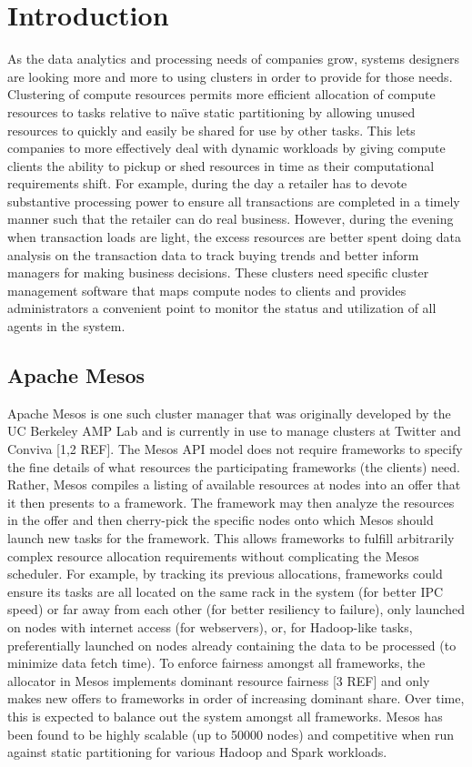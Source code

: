 \section{Introduction}
\label{sec:intro}

As the data analytics and processing needs of companies grow, systems designers are looking more and more to using clusters in order to provide for those needs. Clustering of compute resources permits more efficient allocation of compute resources to tasks relative to na\"{\i}ve static partitioning by allowing unused resources to quickly and easily be shared for use by other tasks. This lets companies to more effectively deal with dynamic workloads by giving compute clients the ability to pickup or shed resources in time as their computational requirements shift. For example, during the day a retailer has to devote substantive processing power to ensure all transactions are completed in a timely manner such that the retailer can do real business. However, during the evening when transaction loads are light, the excess resources are better spent doing data analysis on the transaction data to track buying trends and better inform managers for making business decisions. These clusters need specific cluster management software that maps compute nodes to clients and provides administrators a convenient point to monitor the status and utilization of all agents in the system.

\subsection{Apache Mesos}
Apache Mesos is one such cluster manager that was originally developed by the UC Berkeley AMP Lab and is currently in use to manage clusters at Twitter and Conviva [1,2 REF]. The Mesos API model does not require frameworks to specify the fine details of what resources the participating frameworks (the clients) need. Rather, Mesos compiles a listing of available resources at nodes into an offer that it then presents to a framework. The framework may then analyze the resources in the offer and then cherry-pick the specific nodes onto which Mesos should launch new tasks for the framework. This allows frameworks to fulfill arbitrarily complex resource allocation requirements without complicating the Mesos scheduler. For example, by tracking its previous allocations, frameworks could ensure its tasks are all located on the same rack in the system (for better IPC speed) or far away from each other (for better resiliency to failure), only launched on nodes with internet access (for webservers), or, for Hadoop-like tasks, preferentially launched on nodes already containing the data to be processed (to minimize data fetch time). To enforce fairness amongst all frameworks, the allocator in Mesos implements dominant resource fairness [3 REF] and only makes new offers to frameworks in order of increasing dominant share. Over time, this is expected to balance out the system amongst all frameworks. Mesos has been found to be highly scalable (up to 50000 nodes) and competitive when run against static partitioning for various Hadoop and Spark workloads.

